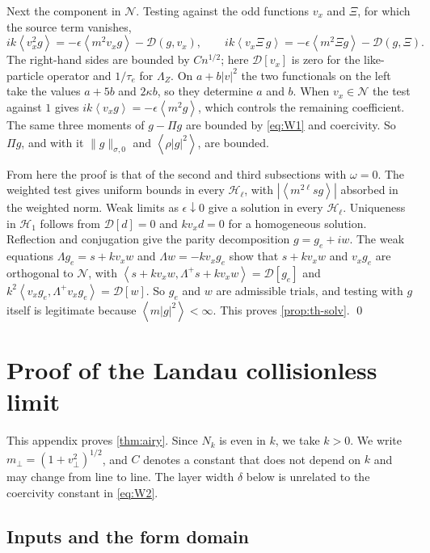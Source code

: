 \documentclass[11pt]{article}
\newcommand{\av}[1]{\left\langle #1\right\rangle}
\newcommand{\D}{\mathcal D}
\newcommand{\HH}{\mathcal H}
\newcommand{\N}{\mathcal N}
\newcommand{\kap}{\kappa}
\newcommand{\dual}[1]{\left\langle #1,\Lambda^+ #1\right\rangle}
\theoremstyle{definition}
\theoremstyle{remark}
\numberwithin{equation}{section}
\begin{document}
Next the component in $\N$. Testing against the odd functions $v_x$ and
$\Xi$, for which the source term vanishes,
\[
 ik\av{v_x^2g}=-\epsilon\av{m^2v_xg}-\D(g,v_x),\qquad
 ik\av{v_x\Xi\,g}=-\epsilon\av{m^2\Xi g}-\D(g,\Xi).
\]
The right-hand sides are bounded by $Cn^{1/2}$; here $\D[v_x]$ is zero
for the like-particle operator and $1/\tau_e$ for $\Lambda_Z$. On
$a+b|v|^2$ the two functionals on the left take the values $a+5b$ and
$2\kap b$, so they determine $a$ and $b$. When $v_x\in\N$ the test against
$1$ gives $ik\av{v_xg}=-\epsilon\av{m^2g}$, which controls the remaining
coefficient. The same three moments of $g-\Pi g$ are bounded by
\eqref{eq:W1} and coercivity. So $\Pi g$, and with it $\|g\|_{\sigma,0}$
and $\av{\rho|g|^2}$, are bounded.

From here the proof is that of the second and third subsections with
$\omega=0$. The weighted test gives uniform bounds in every $\HH_\ell$,
with $|\av{m^{2\ell}sg}|$ absorbed in the weighted norm. Weak limits as
$\epsilon\downarrow0$ give a solution in every $\HH_\ell$. Uniqueness in
$\HH_1$ follows from $\D[d]=0$ and $kv_xd=0$ for a homogeneous solution.
Reflection and conjugation give the parity decomposition $g=g_e+iw$. The
weak equations $\Lambda g_e=s+kv_xw$ and $\Lambda w=-kv_xg_e$ show that
$s+kv_xw$ and $v_xg_e$ are orthogonal to $\N$, with
$\dual{s+kv_xw}=\D[g_e]$ and $k^2\dual{v_xg_e}=\D[w]$. So $g_e$ and $w$ are
admissible trials, and testing with $g$ itself is legitimate because
$\av{m|g|^2}<\infty$. This proves \cref{prop:th-solv}. \qed

\section{Proof of the Landau collisionless limit}\label{app:airy}

This appendix proves \cref{thm:airy}. Since $N_k$ is even in $k$, we take
$k>0$. We write $m_\perp=(1+v_\perp^2)^{1/2}$, and $C$ denotes a constant
that does not depend on $k$ and may change from line to line. The layer
width $\delta$ below is unrelated to the coercivity constant in
\eqref{eq:W2}.

\subsection{Inputs and the form domain}
\end{document}
